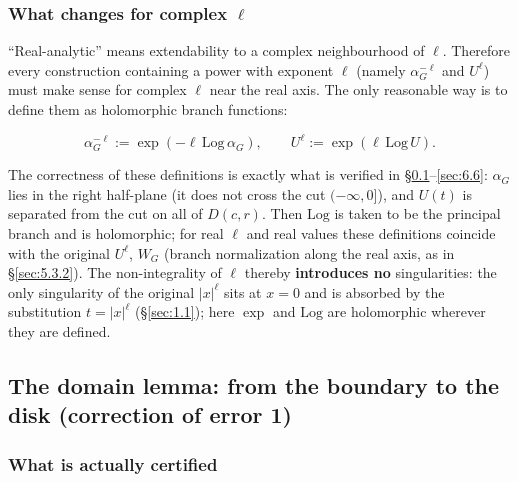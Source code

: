 \subsubsection{What changes for complex $\ell$}
\label{sec:6.3.2}

``Real-analytic'' means extendability to a complex neighbourhood of $\ell$.
Therefore every construction containing a power with exponent $\ell$ (namely
$\alpha_G^{-\ell}$ and $U^{\ell}$) must make sense for complex $\ell$ near the
real axis. The only reasonable way is to define them as holomorphic branch
functions:

\[
\alpha_G^{-\ell}:=\exp(-\ell\,\mathrm{Log}\,\alpha_G),\qquad
U^{\ell}:=\exp(\ell\,\mathrm{Log}\,U).
\]

The correctness of these definitions is exactly what is verified in
\S\ref{sec:6.4}--\ref{sec:6.6}: $\alpha_G$ lies in the right half-plane (it does not cross the
cut $(-\infty,0]$), and $U(t)$ is separated from the cut on all of $D(c,r)$.
Then $\mathrm{Log}$ is taken to be the principal branch and is holomorphic;
for real $\ell$ and real values these definitions coincide with the original
$U^{\ell}$, $W_G$ (branch normalization along the real axis, as in \S\ref{sec:5.3.2}). The non-integrality of $\ell$ thereby \textbf{introduces no}
singularities: the only singularity of the original $|x|^{\ell}$ sits at
$x=0$ and is absorbed by the substitution $t=|x|^{\ell}$ (\S\ref{sec:1.1}); here $\exp$ and $\mathrm{Log}$ are holomorphic wherever they are
defined.


\subsection{The domain lemma: from the boundary to the disk (correction of error 1)}
\label{sec:6.4}

\subsubsection{What is actually certified}
\label{sec:6.4.1}

